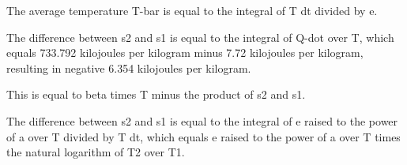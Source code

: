 The average temperature T-bar is equal to the integral of T dt divided by e.

The difference between s2 and s1 is equal to the integral of Q-dot over T, which equals 733.792 kilojoules per kilogram minus 7.72 kilojoules per kilogram, resulting in negative 6.354 kilojoules per kilogram.

This is equal to beta times T minus the product of s2 and s1.

The difference between s2 and s1 is equal to the integral of e raised to the power of a over T divided by T dt, which equals e raised to the power of a over T times the natural logarithm of T2 over T1.